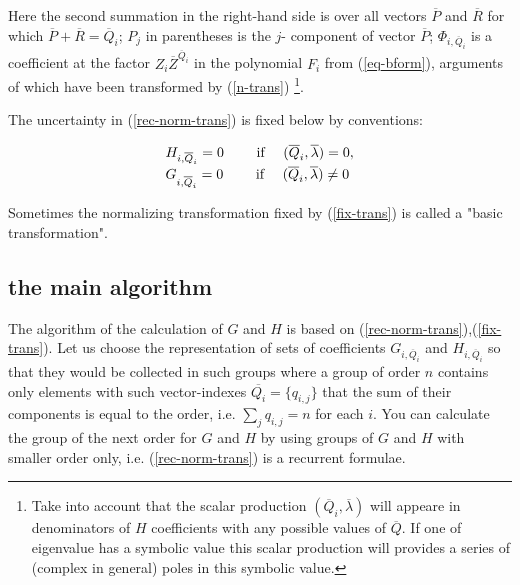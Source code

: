 \noindent
Here the second summation in the right-hand side is over all vectors 
$\overline{P}$ and $\overline{R}$ for which  
$\overline{P}+\overline{R}=\overline{Q}_i$; $P_j$ in parentheses is the
$j$- component of vector $\overline{P}$; $\Phi_{i,\overline{Q}_i}$ is a
coefficient at the factor $Z_i \overline{Z}^{\overline{Q}_i}$ in the 
polynomial $F_i$ from (\ref{eq-bform}), arguments of which have been
transformed by 
(\ref{n-trans}) \footnote{Take into account that the scalar production 
$(\overline{Q}_i,\overline{\lambda})$ will appeare in denominators of 
$H$ coefficients with any possible values of $\overline{Q}$. If one of
eigenvalue has a symbolic value this scalar production 
will provides a series of (complex in general) poles in this 
symbolic value.}.

The uncertainty in (\ref{rec-norm-trans}) is fixed below by conventions:

\begin{equation}
\label{fix-trans}
\begin{array}{l}
\mbox{$H_{\mathstrut i,\overline{Q}_i}=0 
   \qquad$ if $\quad(\overline{Q}_i,\overline{\lambda})=0,$} \\
\mbox{$G_{i,\overline{Q}_i}^{\mathstrut \ }=0 
   \qquad$ if $\quad(\overline{Q}_i,\overline{\lambda})\not =0$}
\end{array}
\end{equation}


Sometimes the normalizing transformation fixed by (\ref{fix-trans})
is called a "basic transformation".


\subsection{the main algorithm}

The algorithm of the calculation of $G$ and $H$ is based on
(\ref{rec-norm-trans}),(\ref{fix-trans}). Let us
choose the representation of sets of coefficients $G_{i,\overline{Q}_i}$
and $H_{i,\overline{Q}_i}$ so that they would be collected in such 
groups where a group of order $n$ contains only elements with such 
vector-indexes $\overline{Q_i} = \{q_{i,j}\}$ that the sum of their 
components is equal to the order, i.e. $\sum_{j}q_{i,j}=n$ for
each $i$. You can calculate the group of the next order for
$G$ and $H$ by using groups of $G$ and $H$ with smaller order only, 
i.e. (\ref{rec-norm-trans}) is a recurrent formulae.

\vspace{0.07in}


